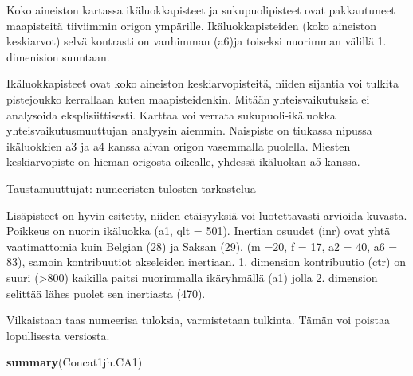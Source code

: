 \documentclass[
  finnish,
]{book}
\newenvironment{Shaded}{\begin{snugshade}}{\end{snugshade}}
\newcommand{\KeywordTok}[1]{\textcolor[rgb]{0.13,0.29,0.53}{\textbf{#1}}}
\newcommand{\NormalTok}[1]{#1}
\begin{document}
Koko aineiston kartassa ikäluokkapisteet ja sukupuolipisteet ovat
pakkautuneet maapisteitä tiiviimmin origon ympärille. Ikäluokkapisteiden
(koko aineiston keskiarvot) selvä kontrasti on vanhimman (a6)ja toiseksi
nuorimman välillä 1. dimenision suuntaan.

Ikäluokkapisteet ovat koko aineiston keskiarvopisteitä, niiden sijantia
voi tulkita pistejoukko kerrallaan kuten maapisteidenkin. Mitään
yhteisvaikutuksia ei analysoida eksplisiittisesti. Karttaa voi verrata
sukupuoli-ikäluokka yhteisvaikutusmuuttujan analyysin aiemmin. Naispiste
on tiukassa nipussa ikäluokkien a3 ja a4 kanssa aivan origon vasemmalla
puolella. Miesten keskiarvopiste on hieman origosta oikealle, yhdessä
ikäluokan a5 kanssa.

Taustamuuttujat: numeeristen tulosten tarkastelua

Lisäpisteet on hyvin esitetty, niiden etäisyyksiä voi luotettavasti
arvioida kuvasta. Poikkeus on nuorin ikäluokka (a1, qlt = 501). Inertian
osuudet (inr) ovat yhtä vaatimattomia kuin Belgian (28) ja Saksan (29),
(m =20, f = 17, a2 = 40, a6 = 83), samoin kontribuutiot akseleiden
inertiaan. 1. dimension kontribuutio (ctr) on suuri (\textgreater800)
kaikilla paitsi nuorimmalla ikäryhmällä (a1) jolla 2. dimension selittää
lähes puolet sen inertiasta (470).

Vilkaistaan taas numeerisa tuloksia, varmistetaan tulkinta. Tämän voi
poistaa lopullisesta versiosta.

\begin{Shaded}
\begin{Highlighting}[]
\KeywordTok{summary}\NormalTok{(Concat1jh.CA1)}
\end{Highlighting}
\end{Shaded}
\end{document}
